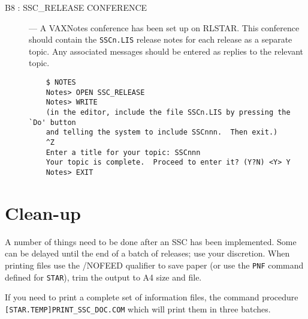 \begin{description}
\item [B8 : SSC\_RELEASE CONFERENCE] --- A VAXNotes conference has been set up
on RLSTAR. This conference should contain the {\tt SSCn.LIS} release notes for
each release as a separate topic.
Any associated messages should be entered as replies to the relevant topic.

\begin{verbatim}
    $ NOTES
    Notes> OPEN SSC_RELEASE
    Notes> WRITE
    (in the editor, include the file SSCn.LIS by pressing the `Do' button
    and telling the system to include SSCnnn.  Then exit.)
    ^Z
    Enter a title for your topic: SSCnnn
    Your topic is complete.  Proceed to enter it? (Y?N) <Y> Y
    Notes> EXIT
\end{verbatim}

\end{description}

\section {Clean-up}

A number of things need to be done after an SSC has been implemented.
Some can be delayed until the end of a batch of releases; use your discretion.
When printing files use the /NOFEED qualifier to save paper (or use the
{\tt PNF} command defined for {\tt STAR}), trim the output to A4 size and file.

If you need to print a complete set of information files, the command
procedure {\tt [STAR.TEMP]\-PRINT\_SSC\_DOC.COM} which will print them in three
batches.

